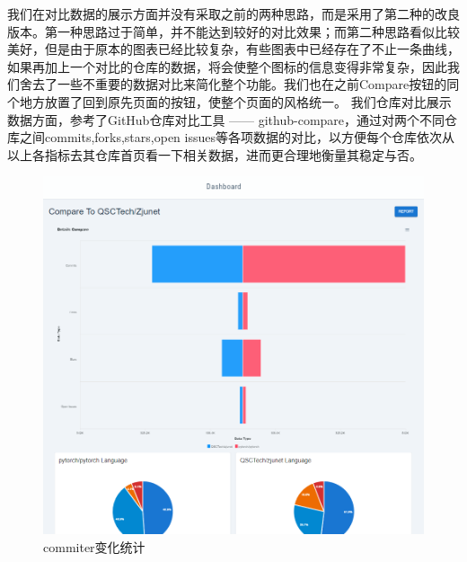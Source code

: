\documentclass[a4paper,20pt]{article}
\begin{document}
我们在对比数据的展示方面并没有采取之前的两种思路，而是采用了第二种的改良版本。第一种思路过于简单，并不能达到较好的对比效果；而第二种思路看似比较美好，但是由于原本的图表已经比较复杂，有些图表中已经存在了不止一条曲线，如果再加上一个对比的仓库的数据，将会使整个图标的信息变得非常复杂，因此我们舍去了一些不重要的数据对比来简化整个功能。我们也在之前Compare按钮的同个地方放置了回到原先页面的按钮，使整个页面的风格统一。
我们仓库对比展示数据方面，参考了GitHub仓库对比工具 —— github-compare，通过对两个不同仓库之间commits,forks,stars,open issues等各项数据的对比，以方便每个仓库依次从以上各指标去其仓库首页看一下相关数据，进而更合理地衡量其稳定与否。
\begin{figure}[h]
\centering
\includegraphics[scale=0.2]{pics/compareData.png}
\caption{commiter变化统计}
\label{fig:1}
\end{figure}
\end{document}
